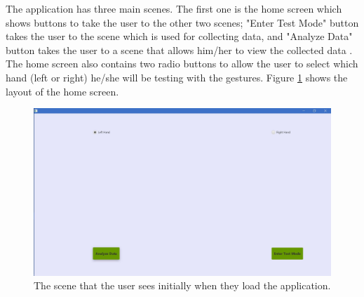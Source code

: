 The application has three main scenes. The first one is the home screen which shows buttons to take the user to the other two scenes; "Enter Test Mode" button takes the user to the scene which is used for collecting data, and "Analyze Data" button takes the user to a scene that allows him/her to view the collected data \parencite{theKey}. The home screen also contains two radio buttons to allow the user to select which hand (left or right) he/she will be testing with the gestures. Figure  \ref{fig:homeScreen} shows the layout of the home screen. 
\begin{figure}[H]
\centering
\includegraphics[scale=0.35]{Figures/6_homeScreen.JPG}
\caption[Home Screen Layout]{The scene that the user sees initially when they load the application.}
\label{fig:homeScreen}
\end{figure}


